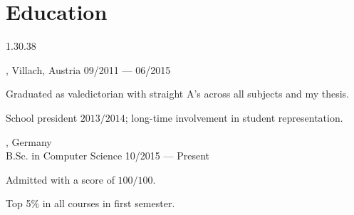 \section{Education}{1.3}{0.38}
\begin{entry}
	{, Villach, Austria}{}
	{09/2011 --- 06/2015}
	\item Graduated as valedictorian with straight A's across all subjects and my thesis.
	\item School president $2013/2014$; long-time involvement in student representation.
\end{entry}
\begin{entry}
	{, Germany}
	{\\B.Sc. in Computer Science}
	{10/2015 --- Present}
	\item Admitted with a score of $100/100$.
  \item Top 5\% in all courses in first semester.
\end{entry}



